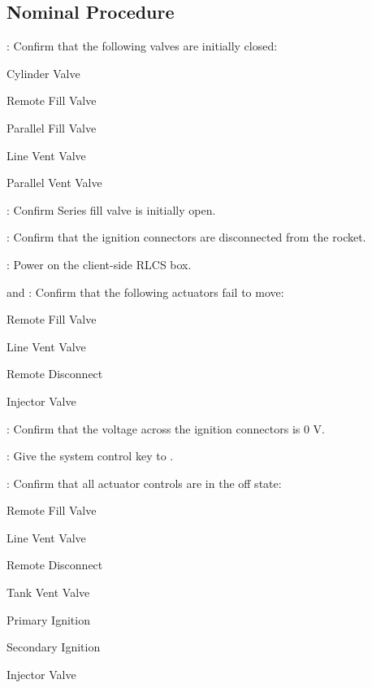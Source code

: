 \subsection{Nominal Procedure}
\begin{checklist}
    \item \primary{}: Confirm that the following valves are initially closed:
        \begin{checklist}
        \item Cylinder Valve
        \item Remote Fill Valve
        \item Parallel Fill Valve
        \item Line Vent Valve
        \item Parallel Vent Valve
    \end{checklist}
    \item \primary{}: Confirm Series fill valve is initially open.
    \item \primary{}: Confirm that the ignition connectors are disconnected from the rocket.
    \item \control{}: Power on the client-side RLCS box.
    \item \control{} and \secondary: Confirm that the following actuators fail to move:
    \begin{checklist}
        \item Remote Fill Valve
        \item Line Vent Valve
        \item Remote Disconnect
        \item Injector Valve
    \end{checklist}
    \item \secondary: Confirm that the voltage across the ignition connectors is 0 V.
    \item \ops: Give the system control key to \control{}.
    \item \control: Confirm that all actuator controls are in the off state:
    \begin{checklist}
        \item Remote Fill Valve
        \item Line Vent Valve
        \item Remote Disconnect
        \item Tank Vent Valve
        \item Primary Ignition
        \item Secondary Ignition
        \item Injector Valve

\end{checklist}
\end{checklist}

